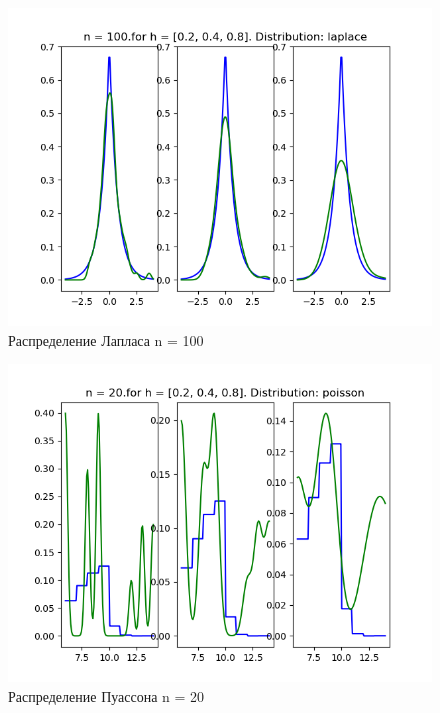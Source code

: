 \documentclass[a4]{article}
\begin{document}
\begin{center}
\begin{figure}[h!]
			\includegraphics[width=\textwidth]{laplaceker100.png}
			\caption[Распределение Лапласа n = 100]{Распределение Лапласа n = 100}
		\end{figure}
		\newpage
		\begin{figure}[h!]
			\includegraphics[width=\textwidth]{poissonker20.png}
			\caption[Распределение Пуассона n = 20]{Распределение Пуассона n = 20}
		\end{figure}
		\newpage
		\begin{figure}[h!]

\end{figure}
\end{center}
\end{document}

